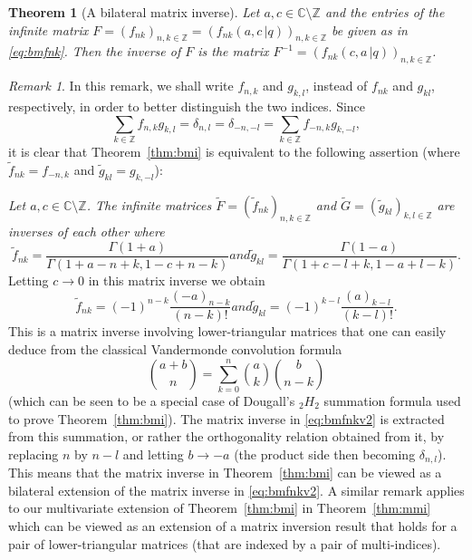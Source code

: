 \documentclass[reqno,12pt]{amsart}
\newtheorem{theorem}{Theorem}
\newenvironment{theoremp}[1]
  {\renewcommand{\thetheorem}{\ref{#1}$'$}%
   \addtocounter{theorem}{-1}%
   \begin{theorem}}
   {\end{theorem}}
\theoremstyle{remark}
\newtheorem{remark}{Remark}
\numberwithin{equation}{section}
\newcommand{\Z}{\mathbb Z}
\newcommand{\C}{\mathbb C}
\begin{document}
\begin{theoremp}{thm:bmi}[A bilateral matrix inverse]\label{thm:bmip}
Let $a,c\in\C\setminus\Z$ and the entries of the infinite matrix
  $F=(f_{nk})_{n,k\in\mathbb Z}=(f_{nk}(a,c\,|q))_{n,k\in\mathbb Z}$
  be given as in \eqref{eq:bmfnk}. Then the inverse of $F$ is the matrix
  $F^{-1}=(f_{nk}(c,a\,|q))_{n,k\in\mathbb Z}$.
\end{theoremp}
\begin{remark}
  In this remark, we shall write
  $f_{n,k}$ and $g_{k,l}$, instead of $f_{nk}$ and $g_{kl}$,
respectively, in order to better distinguish the two indices.
Since
 $$
\sum_{k\in\mathbb Z}f_{n,k}g_{k,l}=\delta_{n,l}=\delta_{-n,-l}=
\sum_{k\in\mathbb Z}f_{-n,k}g_{k,-l},
$$
it is clear that Theorem~\ref{thm:bmi} is equivalent to the
following assertion (where $\tilde{f}_{nk}=f_{-n,k}$ and
$\tilde{g}_{kl}=g_{k,-l}$):

\textit{Let $a,c\in\mathbb C\setminus\mathbb Z$.
  The infinite matrices 
  $\tilde{F}=(\tilde{f}_{nk})_{n,k\in\mathbb Z}$ and
  $\tilde{G}=(\tilde{g}_{kl})_{k,l\in\mathbb Z}$ are
inverses of each other where}
\begin{subequations}\label{eq:bmfnkv1}
\begin{equation}
\tilde{f}_{nk}=\frac{\Gamma(1+a)}
{\Gamma(1+a-n+k,1-c+n-k)}
\end{equation}
 \textit{and}
\begin{equation}
\tilde{g}_{kl}=\frac{\Gamma(1-a)}
{\Gamma(1+c-l+k,1-a+l-k)}.
\end{equation} 
\end{subequations}
Letting $c\to 0$ in this matrix inverse we obtain
\begin{subequations}\label{eq:bmfnkv2}
\begin{equation}
\tilde{f}_{nk}=(-1)^{n-k}\frac{(-a)_{n-k}}
{(n-k)!}
\end{equation}
and
\begin{equation}
\tilde{g}_{kl}=(-1)^{k-l}\frac{(a)_{k-l}}
{(k-l)!}.
\end{equation}
\end{subequations}
This is a matrix inverse involving lower-triangular matrices
that one can easily deduce
from the classical Vandermonde convolution formula
$$
\binom{a+b}{n}=\sum_{k=0}^n\binom ak\binom b{n-k}
$$
(which can be seen to be a special case of Dougall's $_2H_2$ summation
formula used to prove Theorem~\ref{thm:bmi}).
The matrix inverse in \eqref{eq:bmfnkv2}
is extracted from this summation,
or rather the orthogonality relation obtained from it,
by replacing $n$ by $n-l$ and letting $b\to -a$
(the product side then becoming $\delta_{n,l}$).
This means that the matrix inverse in
Theorem~\ref{thm:bmi} can be viewed as a bilateral
extension of the matrix inverse in \eqref{eq:bmfnkv2}.
A similar remark applies to our multivariate extension of
Theorem~\ref{thm:bmi} in Theorem~\ref{thm:mmi} which can be viewed
as an extension of a matrix inversion result that holds for
a pair of lower-triangular matrices (that are
indexed by a pair of multi-indices).
\end{remark}
\end{document}

